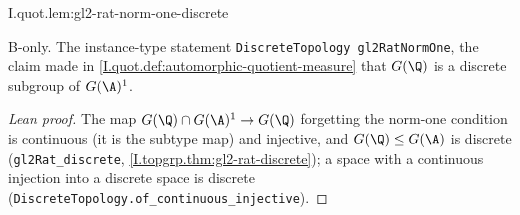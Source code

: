 \begin{lemma}[$G(\Q)$ is discrete in $G(\A)^1$]
\bonly
{}
\end{lemma}
\begin{tfformal}{I.quot.lem:gl2-rat-norm-one-discrete}
\begin{tffidelity}
B-only. The instance-type statement \texttt{DiscreteTopology gl2RatNormOne}, the claim made in \cref{I.quot.def:automorphic-quotient-measure} that $G(\Q)$ is a discrete subgroup of $G(\A)^1$.
\end{tffidelity}
\end{tfformal}
\begin{proof}[Lean proof]
The map $G(\Q)\cap G(\A)^1\to G(\Q)$ forgetting the norm-one condition is continuous (it is the subtype map) and injective, and $G(\Q)\le G(\A)$ is discrete (\texttt{gl2Rat\_discrete}, \cref{I.topgrp.thm:gl2-rat-discrete}); a space with a continuous injection into a discrete space is discrete (\texttt{DiscreteTopology.of\_continuous\_injective}).
\end{proof}


